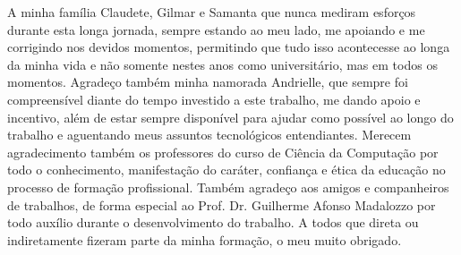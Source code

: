 
\begin{resumo}[AGRADECIMENTOS]
\begin{SingleSpacing}

A minha família Claudete, Gilmar e Samanta que nunca mediram esforços durante esta longa jornada, sempre estando ao meu lado, me apoiando e me corrigindo nos devidos momentos, permitindo que tudo isso acontecesse ao longa da minha vida e não somente nestes anos como universitário, mas em todos os momentos. Agradeço também minha namorada Andrielle, que sempre foi compreensível diante do tempo investido a este trabalho, me dando apoio e incentivo, além de estar sempre disponível para ajudar como possível ao longo do trabalho e aguentando meus assuntos tecnológicos entendiantes. Merecem agradecimento também os professores do curso de Ciência da Computação por todo o conhecimento, manifestação do caráter, confiança e ética da educação no processo de formação profissional. Também agradeço aos amigos e companheiros de trabalhos, de forma especial ao Prof. Dr. Guilherme Afonso Madalozzo por todo auxílio durante o desenvolvimento do trabalho. A todos que direta ou indiretamente fizeram parte da minha formação, o meu muito obrigado.

\end{SingleSpacing}
\end{resumo}